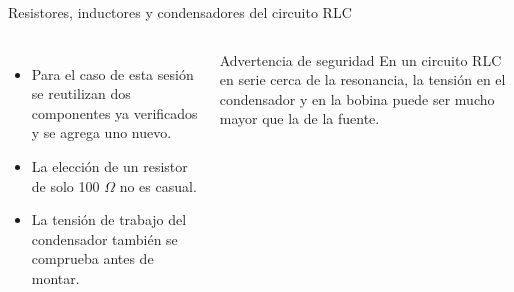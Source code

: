 \documentclass[aspectratio=169,11pt,xcolor={table}]{beamer}
\begin{document}
\begin{frame}{{\normalsize Resistores, inductores y condensadores del circuito RLC}}
\begin{columns}[c,onlytextwidth]
\small
\begin{itemize}\setlength{\itemsep}{4pt}
  \item Para el caso de esta sesión se reutilizan dos componentes ya verificados y se agrega uno nuevo.
  \item La elección de un resistor de solo 100 \ensuremath{\Omega} no es casual.
  \item La tensión de trabajo del condensador también se comprueba antes de montar.
\end{itemize}
\begin{cardO}{Advertencia de seguridad}
\footnotesize En un circuito RLC en serie cerca de la resonancia, la tensión en el condensador y en la bobina puede ser mucho mayor que la de la fuente.
\end{cardO}
\end{columns}
\end{frame}
\end{document}
